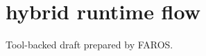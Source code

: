 \documentclass{article}
\begin{document}
\section*{hybrid runtime flow}
Tool-backed draft prepared by FAROS.\n
\end{document}
